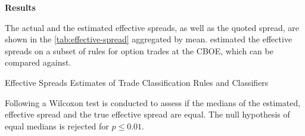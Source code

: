 \textbf{Results}

The actual and the estimated effective spreads, as well as the quoted spread, are shown in the \cref{tab:effective-spread} aggregated by mean. \textcite[][896--897]{savickasInferringDirectionOption2003} estimated the effective spreads on a subset of rules for option trades at the \gls{CBOE}, which can be compared against.

\begin{table}[H]
    \centering
    
    \caption{Effective Spreads Estimates of Trade Classification Rules and Classifiers}
    \label{tab:effective-spread}
\end{table}

Following \textcite[][12]{theissenTestAccuracyLee2000} a Wilcoxon test is conducted to assess if the medians of the estimated, effective spread and the true effective spread are equal. The null hypothesis of equal medians is rejected for $p \leq 0.01$.


